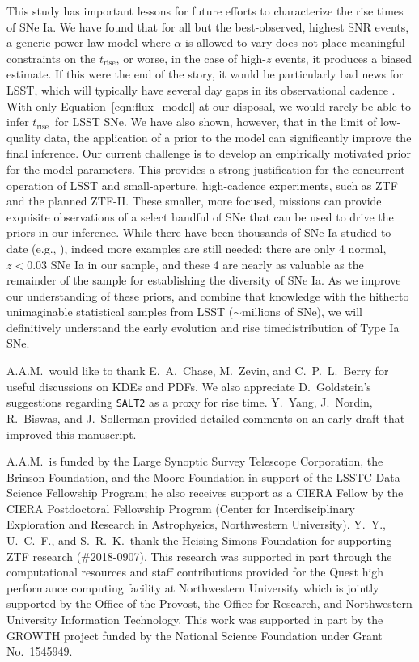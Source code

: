 \documentclass[twocolumn]{./aastex63}
\newcommand{\trise}{$t_\mathrm{rise}$}
\begin{document}
This study has important lessons for future efforts to characterize the rise
times of SNe Ia. We have found that for all but the best-observed, highest SNR
events, a generic power-law model where $\alpha$ is allowed to vary does not
place meaningful constraints on the \trise, or worse, in the case of high-$z$
events, it produces a biased estimate. If this were the end of the story, it
would be particularly bad news for LSST, which will typically have several day
gaps in its observational cadence \citep{Ivezic08}. With only
Equation~\ref{eqn:flux_model} at our disposal, we would rarely be able to
infer \trise\ for LSST SNe. We have also shown, however, that in the limit of
low-quality data, the application of a prior to the model can significantly
improve the final inference. Our current challenge is to develop an
empirically motivated prior for the model parameters. This provides a strong
justification for the concurrent operation of LSST and small-aperture,
high-cadence experiments, such as ZTF and the planned ZTF-II. These smaller,
more focused, missions can provide exquisite observations of a select handful
of SNe that can be used to drive the priors in our inference. While there have
been thousands of SNe Ia studied to date (e.g., \citealt{Jones17}), indeed
more examples are still needed: there are only 4 normal, $z < 0.03$ SNe Ia in
our sample, and these 4 are nearly as valuable as the remainder of the sample
for establishing the diversity of SNe Ia. As we improve our understanding of
these priors, and combine that knowledge with the hitherto unimaginable
statistical samples from LSST ($\sim$millions of SNe), we will definitively
understand the early evolution and rise timedistribution of Type Ia SNe.

\acknowledgements

A.A.M.~would like to thank E.~A.~Chase, M.~Zevin, and C.~P.~L.~Berry for
useful discussions on KDEs and PDFs. We also appreciate D.~Goldstein's
suggestions regarding \texttt{SALT2} as a proxy for rise time. Y.~Yang,
J.~Nordin, R.~Biswas, and J.~Sollerman provided detailed comments on an early
draft that improved this manuscript.

A.A.M.~is funded by the Large Synoptic Survey Telescope Corporation, the
Brinson Foundation, and the Moore Foundation in support of the LSSTC Data
Science Fellowship Program; he also receives support as a CIERA Fellow by the
CIERA Postdoctoral Fellowship Program (Center for Interdisciplinary
Exploration and Research in Astrophysics, Northwestern University). Y.~Y.,
U.~C.~F., and S.~R.~K.~thank the Heising-Simons Foundation for supporting ZTF
research (\#2018-0907). This research was supported in part through the
computational resources and staff contributions provided for the Quest high
performance computing facility at Northwestern University which is jointly
supported by the Office of the Provost, the Office for Research, and
Northwestern University Information Technology. This work was supported in
part by the GROWTH project funded by the National Science Foundation under
Grant No.~1545949.
\end{document}

